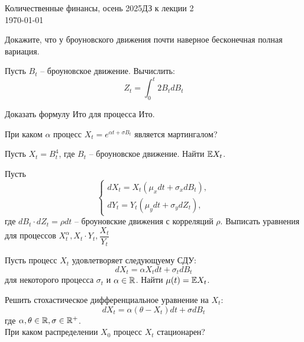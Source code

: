 \documentclass[12pt]{article}
\begin{document}
\noindent Количественные финансы, осень 2025\hfill ДЗ к лекции 2\\
\today

\hrulefill

\begin{problem}
    Докажите, что у броуновского движения почти наверное бесконечная полная вариация.
\end{problem}

\begin{problem}
    Пусть $B_t$ -- броуновское движение. Вычислить:
    $$
        Z_t = \int_0^t 2B_t dB_t
    $$
\end{problem}

\begin{problem}
    Доказать формулу Ито для процесса Ито.
\end{problem}

\begin{problem}
    При каком $\alpha$ процесс $X_t = e^{\alpha t + \sigma B_t}$ является мартингалом? 
\end{problem}

\begin{problem}
    Пусть $X_t = B_t^4$, где $B_t$ -- броуновское движение. Найти $\mathbb{E} X_t$. 
\end{problem}

\begin{problem}
    Пусть
    $$\begin{cases}
        dX_t = X_t (\mu_x dt + \sigma_x dB_t), \\
        dY_t = Y_t (\mu_y dt + \sigma_y dZ_t),
    \end{cases}$$
    где $dB_t\cdot dZ_t = \rho dt$ -- броуновские движения с корреляций $\rho$. Выписать уравнения для процессов $X_t^{\alpha}, X_t \cdot Y_t, \dfrac{X_t}{Y_t}$
\end{problem}

\begin{problem}
    Пусть процесс $X_t$ удовлетворяет следующуему СДУ:
    $$
        dX_t = \alpha X_t dt + \sigma_t dB_t
    $$для некоторого процесса $\sigma_t$ и $\alpha \in \mathbb{R}$. Найти $\mu(t)=\mathbb{E} X_t$.
\end{problem}

\begin{problem}
    Решить стохастическое дифференциальное уравнение на $X_t$:
    $$
        dX_t = \alpha (\theta -  X_t) dt + \sigma dB_t
    $$где $\alpha, \theta \in \mathbb{R}, \sigma \in \mathbb{R}^+$.
    \\
    При каком распределении $X_0$ процесс $X_t$ стационарен?
\end{problem}
\end{document}

